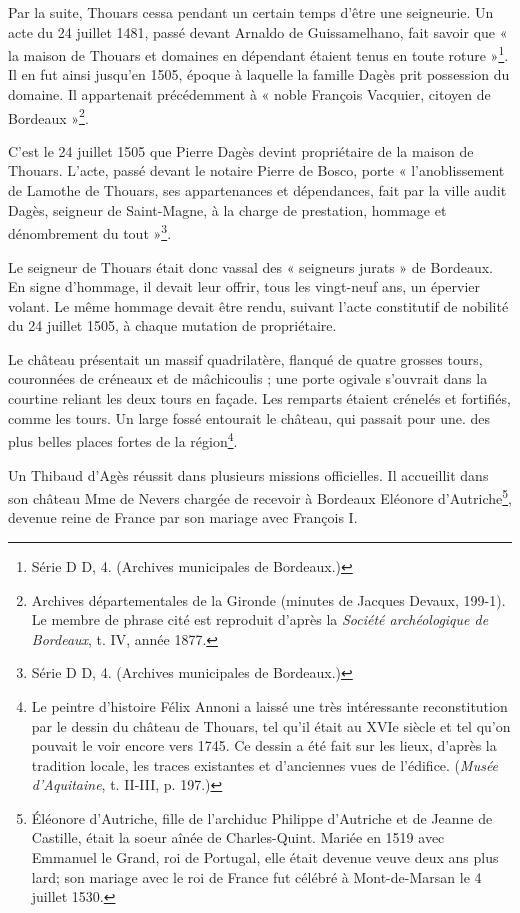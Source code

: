 Par la suite, Thouars cessa pendant un certain temps d'être une seigneurie. Un acte du 24 juillet 1481, passé devant Arnaldo de Guissamelhano, fait savoir que « la maison de Thouars et domaines en dépendant étaient tenus en toute roture »\footnote{Série D D, 4. (Archives municipales de Bordeaux.)}. Il en fut ainsi jusqu'en 1505, époque à laquelle la famille Dagès prit possession du domaine. Il appartenait précédemment à « noble François Vacquier, citoyen de Bordeaux »\footnote{Archives départementales de la Gironde (minutes de Jacques Devaux, 199-1). Le membre de phrase cité est reproduit d'après la \textit{Société archéologique de Bordeaux}, t. IV, année 1877.}.

C'est le 24 juillet 1505 que Pierre Dagès devint propriétaire de la maison de Thouars. L'acte, passé devant le notaire Pierre de Bosco, porte « l'anoblissement de Lamothe de Thouars, ses appartenances et dépendances, fait par la ville audit Dagès, seigneur de Saint-Magne, à la charge de prestation, hommage et dénombrement du tout »\footnote{Série D D, 4. (Archives municipales de Bordeaux.)}.

Le seigneur de Thouars était donc vassal des « seigneurs jurats » de Bordeaux. En signe d'hommage, il devait leur offrir, tous les vingt-neuf ans, un épervier volant. Le même hommage devait être rendu, suivant l'acte constitutif de nobilité du 24 juillet 1505, à chaque mutation de propriétaire.

Le château présentait un massif quadrilatère, flanqué de quatre grosses tours, couronnées de créneaux et de mâchicoulis ; une porte ogivale s'ouvrait dans la courtine reliant les deux tours en façade. Les remparts étaient crénelés et fortifiés, comme les tours. Un large fossé entourait le château, qui passait pour une. des plus belles places fortes de la région\footnote{Le peintre d'histoire Félix Annoni a laissé une très intéressante reconstitution par le dessin du château de Thouars, tel qu'il était au XVIe siècle et tel qu'on pouvait le voir encore vers 1745. Ce dessin a été fait sur les lieux, d'après la tradition locale, les traces existantes et d'anciennes vues de l'édifice. (\textit{Musée d'Aquitaine}, t. II-III, p. 197.)}.

Un Thibaud d'Agès réussit dans plusieurs missions officielles. Il accueillit dans son château Mme de Nevers chargée de recevoir à Bordeaux Eléonore d'Autriche\footnote{Éléonore d'Autriche, fille de l'archiduc Philippe d'Autriche et de Jeanne de Castille, était la soeur aînée de Charles-Quint. Mariée en 1519 avec Emmanuel le Grand, roi de Portugal, elle était devenue veuve deux ans plus lard; son mariage avec le roi de France fut célébré à Mont-de-Marsan le 4 juillet 1530.}, devenue reine de France par son mariage avec François I\ier{}.

